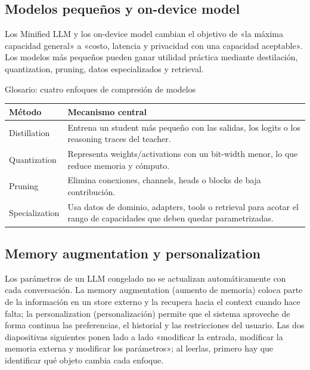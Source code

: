 \subsection{Modelos pequeños y on-device model}

Los Minified LLM y los on-device model cambian el objetivo de «la máxima capacidad general» a «costo, latencia y privacidad con una capacidad aceptable». Los modelos más pequeños pueden ganar utilidad práctica mediante destilación, quantization, pruning, datos especializados y retrieval.


\begin{knowledgebox}{Glosario: cuatro enfoques de compresión de modelos}
\begin{tabularx}{\textwidth}{L{0.20\textwidth} X}
\toprule
Método & Mecanismo central \\
\midrule
Distillation & Entrena un student más pequeño con las salidas, los logits o los reasoning traces del teacher. \\
Quantization & Representa weights/activations con un bit-width menor, lo que reduce memoria y cómputo. \\
Pruning & Elimina conexiones, channels, heads o blocks de baja contribución. \\
Specialization & Usa datos de dominio, adapters, tools o retrieval para acotar el rango de capacidades que deben quedar parametrizadas. \\
\bottomrule
\end{tabularx}
\end{knowledgebox}

\subsection{Memory augmentation y personalization}

Los parámetros de un LLM congelado no se actualizan automáticamente con cada conversación. La memory augmentation (aumento de memoria) coloca parte de la información en un store externo y la recupera hacia el context cuando hace falta; la personalization (personalización) permite que el sistema aproveche de forma continua las preferencias, el historial y las restricciones del usuario. Las dos diapositivas siguientes ponen lado a lado «modificar la entrada, modificar la memoria externa y modificar los parámetros»; al leerlas, primero hay que identificar qué objeto cambia cada enfoque.

